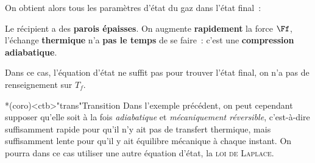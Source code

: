 \documentclass[../../main/main.tex]{subfiles}
\begin{document}
\begin{tcb}[breakable]
	On obtient alors tous les paramètres d'état du gaz dans l'état final~:
	\psw{%
		\[
			P_f = \frac{F_f}{S}
			\qet
			T_f = T_0
			\qet
			V_f = V_i\frac{P_i}{P_f}\frac{T_0}{T_i}.
		\]
	}%
	\begin{isd}
		Le récipient a des \textbf{parois épaisses}. On augmente \textbf{rapidement}
		la force $\Ff$, l'échange \textbf{thermique} n'a \textbf{pas le temps} de se
		faire~: c'est une \textbf{compression adiabatique}.
		\tcblower
		\begin{center}
		\end{center}
	\end{isd}
	Dans ce cas, l'équation d'état ne suffit pas pour trouver l'état final, on n'a
	pas de renseignement sur $T_f$.
\end{tcb}

\begin{tcn}*(coro)<ctb>"trans"{Transition}
	Dans l'exemple précédent, on peut cependant supposer qu'elle soit à la
	fois \textit{adiabatique} et \textit{mécaniquement réversible}, c'est-à-dire
	suffisamment rapide pour qu'il n'y ait pas de transfert thermique, mais
	suffisamment lente pour qu'il y ait équilibre mécanique à chaque instant. On
	pourra dans ce cas utiliser une autre équation d'état, la \textsc{loi de
		\textsc{Laplace}}.
\end{tcn}
\end{document}
